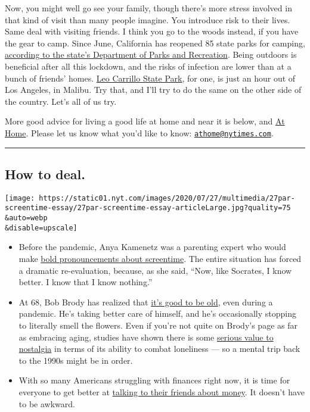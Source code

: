 Now, you might well go see your family, though there's more stress
involved in that kind of visit than many people imagine. You introduce
risk to their lives. Same deal with visiting friends. I think you go to
the woods instead, if you have the gear to camp. Since June, California
has reopened 85 state parks for camping,
\href{https://www.parks.ca.gov/?page_id=30388}{according to the state's
Department of Parks and Recreation}. Being outdoors is beneficial after
all this lockdown, and the risks of infection are lower than at a bunch
of friends' homes. \href{https://www.parks.ca.gov/?page_id=616}{Leo
Carrillo State Park}, for one, is just an hour out of Los Angeles, in
Malibu. Try that, and I'll try to do the same on the other side of the
country. Let's all of us try.

More good advice for living a good life at home and near it is below,
and \href{http://www.nytimes.com/athome}{At Home}. Please let us know
what you'd like to know:
\href{mailto:athome@nytimes.com}{\nolinkurl{athome@nytimes.com}}.

\begin{center}\rule{0.5\linewidth}{\linethickness}\end{center}

\hypertarget{how-to-deal}{%
\subsection{How to deal.}\label{how-to-deal}}

\texttt{[image: https://static01.nyt.com/images/2020/07/27/multimedia/27par-screentime-essay/27par-screentime-essay-articleLarge.jpg?quality=75\\\&auto=webp\\\&disable=upscale]}

\begin{itemize}
\item
  Before the pandemic, Anya Kamenetz was a parenting expert who would
  make
  \href{https://www.nytimes.com/2020/07/27/parenting/children-screen-time-games-phones.html}{bold
  pronouncements about screentime}. The entire situation has forced a
  dramatic re-evaluation, because, as she said, ``Now, like Socrates, I
  know better. I know that I know nothing.''
\item
  At 68, Bob Brody has realized that
  \href{https://www.nytimes.com/2020/07/28/well/live/aging-benefits-pandemic.html}{it's
  good to be old}, even during a pandemic. He's taking better care of
  himself, and he's occasionally stopping to literally smell the
  flowers. Even if you're not quite on Brody's page as far as embracing
  aging, studies have shown there is some
  \href{https://www.nytimes.com/2020/07/28/smarter-living/coronavirus-nostalgia.html}{serious
  value to nostalgia} in terms of its ability to combat loneliness ---
  so a mental trip back to the 1990s might be in order.
\item
  With so many Americans struggling with finances right now, it is time
  for everyone to get better at
  \href{https://www.nytimes.com/2020/07/25/style/how-to-talk-to-friends-about-money.html}{talking
  to their friends about money}. It doesn't have to be awkward.
\end{itemize}

